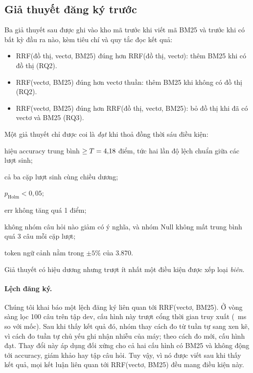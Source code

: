 \subsection{Giả thuyết đăng ký trước}\label{sec:prereg}
Ba giả thuyết sau được ghi vào kho mã trước khi viết mã BM25 và trước khi có bất kỳ đầu ra nào, kèm tiêu chí và quy tắc đọc kết quả:
\begin{itemize}
  \item[\textbf{H1}] RRF(đồ thị, vectơ, BM25) đúng hơn RRF(đồ thị, vectơ): thêm BM25 khi có đồ thị (RQ2).
  \item[\textbf{H2}] RRF(vectơ, BM25) đúng hơn vectơ thuần: thêm BM25 khi không có đồ thị (RQ2).
  \item[\textbf{H3}] RRF(vectơ, BM25) đúng hơn RRF(đồ thị, vectơ, BM25): bỏ đồ thị khi đã có vectơ và BM25 (RQ3).
\end{itemize}
Một giả thuyết chỉ được coi là \emph{đạt} khi thoả đồng thời sáu điều kiện:
\begin{enumerate*}[label=(\roman*)]
  \item hiệu accuracy trung bình $\ge T = 4{,}18$ điểm, tức hai lần độ lệch chuẩn giữa các lượt sinh;
  \item cả ba cặp lượt sinh cùng chiều dương;
  \item $p_{\text{Holm}} < 0{,}05$;
  \item err không tăng quá 1 điểm;
  \item không nhóm câu hỏi nào giảm có ý nghĩa, và nhóm Null không mất trung bình quá 3 câu mỗi cặp lượt;
  \item token ngữ cảnh nằm trong $\pm 5\%$ của 3.870.
\end{enumerate*}
Giả thuyết có hiệu dương nhưng trượt ít nhất một điều kiện được xếp loại \emph{biên}.

\paragraph{Lệch đăng ký.}
Chúng tôi khai báo một lệch đăng ký liên quan tới RRF(vectơ, BM25).
Ở vòng sàng lọc 100 câu trên tập dev, cấu hình này trượt cổng thời gian truy xuất (\timeGateFail~ms so với mốc).
Sau khi thấy kết quả đó, nhóm thay cách đo từ tuần tự sang xen kẽ, vì cách đo tuần tự chủ yếu ghi nhận nhiễu của máy; theo cách đo mới, cấu hình đạt.
Thay đổi này áp dụng đối xứng cho cả hai cấu hình có BM25 và không động tới accuracy, giám khảo hay tập câu hỏi.
Tuy vậy, vì nó được viết sau khi thấy kết quả, mọi kết luận liên quan tới RRF(vectơ, BM25) đều mang điều kiện này.

